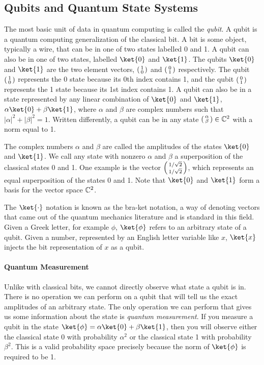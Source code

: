 \subsection{Qubits and Quantum State Systems}
The most basic unit of data in quantum computing is called the \emph{qubit}.
A qubit is a quantum computing generalization of the classical bit.
A bit is some object, typically a wire, that can be in one of two states labelled 0 and 1.
A qubit can also be in one of two states, labelled $\ket{0}$ and $\ket{1}$.
The qubits $\ket{0}$ and $\ket{1}$ are the two element vectors, $\left(\begin{smallmatrix}1\\0\end{smallmatrix}\right)$ and $\left(\begin{smallmatrix}0\\1\end{smallmatrix}\right)$ respectively.
The qubit $\left(\begin{smallmatrix}1\\0\end{smallmatrix}\right)$ represents the 0 state because its 0th index contains 1, and the qubit $\left(\begin{smallmatrix}0\\1\end{smallmatrix}\right)$ represents the 1 state because its 1st index contains 1.
A qubit can also be in a state represented by any linear combination of $\ket{0}$ and $\ket{1}$,  $\alpha\ket{0}+\beta\ket{1}$, where $\alpha$ and $\beta$ are complex numbers such that $|\alpha|^2 + |\beta|^2=1$.
Written differently, a qubit can be in any state $\left(\begin{smallmatrix}\alpha \\ \beta\end{smallmatrix}\right) \in \mathbb{C}^{2}$ with a norm equal to 1.

The complex numbers $\alpha$ and $\beta$ are called the amplitudes of the states $\ket{0}$ and $\ket{1}$.
We call any state with nonzero $\alpha$ and $\beta$ a superposition of the classical states 0 and 1.
One example is the vector $\left(\begin{smallmatrix}1/\sqrt{2}\\ 1/\sqrt{2}\end{smallmatrix}\right)$, which represents an equal superposition of the states 0 and 1. 
Note that $\ket{0}$ and $\ket{1}$ form a basis for the vector space $\mathbb{C}^{2}$.

The $\ket{\cdot}$ notation is known as the bra-ket notation, a way of denoting vectors that came out of the quantum mechanics literature and is standard in this field. 
Given a Greek letter, for example $\phi$, $\ket{\phi}$ refers to an arbitrary state of a qubit.
Given a number, represented by an English letter variable like $x$, $\ket{x}$ injects the bit representation of $x$ as a qubit.

\paragraph{Quantum Measurement}
Unlike with classical bits, we cannot directly observe what state a qubit is in.
There is no operation we can perform on a qubit that will tell us the exact amplitudes of an arbitrary state.
The only operation we can perform that gives us some information about the state is \emph{quantum measurement}.
If you measure a qubit in the state $\ket{\phi} = \alpha\ket{0} + \beta\ket{1}$, then you will observe either the classical state 0 with probability $\alpha^2$ or the classical state 1 with probability $\beta^2$. This is a valid probability space precisely because the norm of $\ket{\phi}$ is required to be 1.

